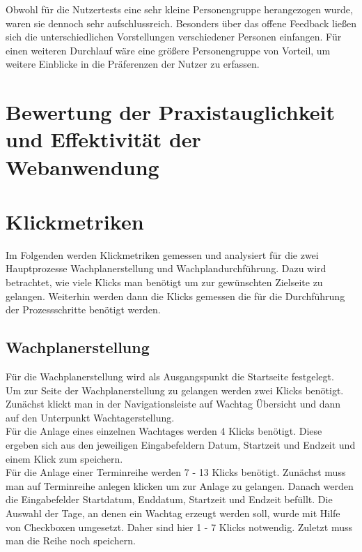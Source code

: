 \documentclass[fontsize=12pt,openright,oneside,paper=a4,BCOR=1cm]{scrbook}
\begin{document}
Obwohl für die Nutzertests eine sehr kleine Personengruppe herangezogen wurde, waren sie dennoch sehr aufschlussreich. Besonders über das offene Feedback ließen sich die unterschiedlichen Vorstellungen verschiedener Personen einfangen. Für einen weiteren Durchlauf wäre eine größere Personengruppe von Vorteil, um weitere Einblicke in die Präferenzen der Nutzer zu erfassen.

\section{Bewertung der Praxistauglichkeit und Effektivität der Webanwendung}


\section{Klickmetriken}
Im Folgenden werden Klickmetriken gemessen und analysiert für die zwei Hauptprozesse Wachplanerstellung und Wachplandurchführung. Dazu wird betrachtet, wie viele Klicks man benötigt um zur gewünschten Zielseite zu gelangen. Weiterhin werden dann die Klicks gemessen die für die Durchführung der Prozessschritte benötigt werden.

\subsection{Wachplanerstellung}
Für die Wachplanerstellung wird als Ausgangspunkt die Startseite festgelegt. \\
Um zur Seite der Wachplanerstellung zu gelangen werden zwei Klicks benötigt. Zunächst klickt man in der Navigationsleiste auf \glqq Wachtag Übersicht\grqq{} und dann auf den Unterpunkt \glqq Wachtagerstellung\grqq{}. \\
Für die Anlage eines einzelnen Wachtages werden 4 Klicks benötigt. Diese ergeben sich aus den jeweiligen Eingabefeldern \glqq Datum\grqq{}, \glqq Startzeit\grqq{} und \glqq Endzeit\grqq{} und einem Klick zum speichern. \\
Für die Anlage einer Terminreihe werden 7 - 13 Klicks benötigt. Zunächst muss man auf \glqq Terminreihe anlegen\grqq{} klicken um zur Anlage zu gelangen. Danach werden die Eingabefelder \glqq Startdatum\grqq{}, \glqq Enddatum\grqq{}, \glqq Startzeit\grqq{} und \glqq Endzeit\grqq{} befüllt. Die Auswahl der Tage, an denen ein Wachtag erzeugt werden soll, wurde mit Hilfe von Checkboxen umgesetzt. Daher sind hier 1 - 7 Klicks notwendig. Zuletzt muss man die Reihe noch speichern. 
\end{document}
